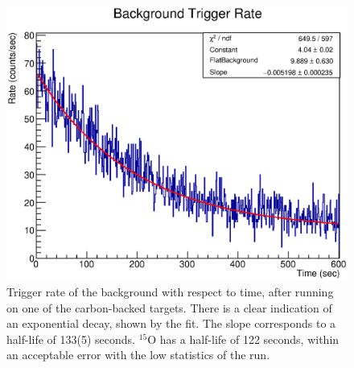 \begin{figure}[!]
    \centering
    \includegraphics[scale=0.7]{Future_Figs/trigger_005.eps}
    \caption{Trigger rate of the background with respect to time, after running on one of the carbon-backed targets. There is a clear indication of an exponential decay, shown by the fit. The slope corresponds to a half-life of 133(5) seconds. $^{15}$O has a half-life of 122 seconds, within an acceptable error with the low statistics of the run.}
    \label{fig:O15decay}
\end{figure}